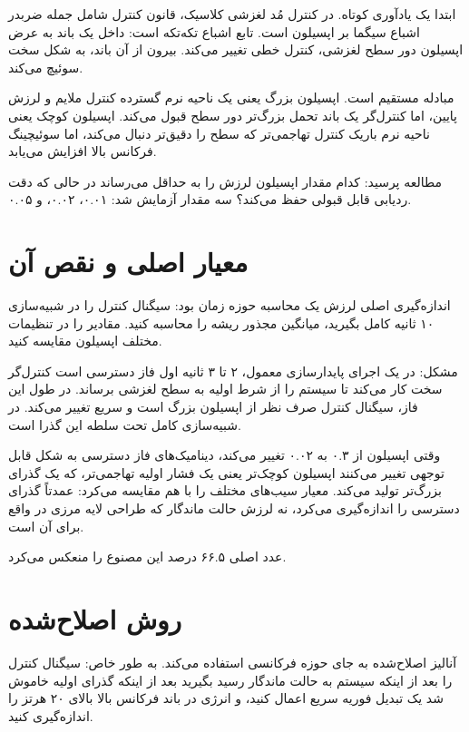 \documentclass[12pt, a4paper]{article}
\newcommand{\dash}{\lr{---}}
\begin{document}
ابتدا يک يادآوری کوتاه. در کنترل مُد لغزشی کلاسيک، قانون کنترل شامل جمله  ضربدر اشباع سيگما بر اپسيلون است. تابع اشباع تکه‌تکه است: داخل يک باند به عرض اپسيلون دور سطح لغزشی، کنترل خطی تغيير می‌کند. بيرون از آن باند، به شکل سخت سوئيچ می‌کند.

مبادله مستقيم است. اپسيلون بزرگ يعنی يک ناحيه نرم گسترده \dash{} کنترل ملايم و لرزش پايين، اما کنترل‌گر يک باند تحمل بزرگ‌تر دور سطح قبول می‌کند. اپسيلون کوچک يعنی ناحيه نرم باريک \dash{} کنترل تهاجمی‌تر که سطح را دقيق‌تر دنبال می‌کند، اما سوئيچينگ فرکانس بالا افزايش می‌يابد.

مطالعه  پرسيد: کدام مقدار اپسيلون لرزش را به حداقل می‌رساند در حالی که دقت رديابی قابل قبولی حفظ می‌کند؟ سه مقدار آزمايش شد: ۰.۰۱، ۰.۰۲، و ۰.۰۵.

\section{معيار اصلی و نقص آن}

اندازه‌گيری اصلی لرزش يک محاسبه  حوزه زمان بود: سيگنال کنترل  را در شبيه‌سازی ۱۰ ثانيه کامل بگيريد، ميانگين مجذور ريشه را محاسبه کنيد. مقادير  را در تنظيمات مختلف اپسيلون مقايسه کنيد.

مشکل: در يک اجرای پايدارسازی معمول، ۲ تا ۳ ثانيه اول فاز دسترسی است \dash{} کنترل‌گر سخت کار می‌کند تا سيستم را از شرط اوليه به سطح لغزشی برساند. در طول اين فاز، سيگنال کنترل صرف نظر از اپسيلون بزرگ است و سريع تغيير می‌کند.  در شبيه‌سازی کامل تحت سلطه اين گذرا است.

وقتی اپسيلون از ۰.۳ به ۰.۰۲ تغيير می‌کند، ديناميک‌های فاز دسترسی به شکل قابل توجهی تغيير می‌کنند \dash{} اپسيلون کوچک‌تر يعنی يک فشار اوليه تهاجمی‌تر، که يک گذرای بزرگ‌تر توليد می‌کند. معيار سيب‌های مختلف را با هم مقايسه می‌کرد: عمدتاً گذرای دسترسی را اندازه‌گيری می‌کرد، نه لرزش حالت ماندگار که طراحی لايه مرزی در واقع برای آن است.

عدد اصلی ۶۶.۵ درصد اين مصنوع را منعکس می‌کرد.

\section{روش اصلاح‌شده}

آناليز اصلاح‌شده به جای حوزه فرکانسی استفاده می‌کند. به طور خاص: سيگنال کنترل را بعد از اينکه سيستم به حالت ماندگار رسيد بگيريد \dash{} بعد از اينکه گذرای اوليه خاموش شد \dash{} يک تبديل فوريه سريع اعمال کنيد، و انرژی در باند فرکانس بالا بالای ۲۰ هرتز را اندازه‌گيری کنيد.
\end{document}
